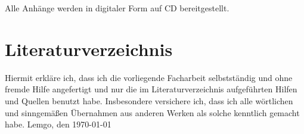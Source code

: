 \documentclass[a4paper,11pt,titlepage,ngerman]{article}
\begin{document}
\begin{sloppypar}
  Alle Anhänge werden in digitaler Form auf CD bereitgestellt.
  \section{Literaturverzeichnis}\label{sec:Literature}
  \printbibliography[heading=none]
  \newpage
  \begin{samepage}
	\thispagestyle{empty}
	Hiermit erkläre ich, dass ich die vorliegende Facharbeit selbstständig und ohne fremde Hilfe angefertigt und nur die im Literaturverzeichnis
	aufgeführten Hilfen und Quellen benutzt habe.
	Insbesondere versichere ich, dass ich alle wörtlichen
	und sinngemäßen Übernahmen aus anderen Werken als solche kenntlich gemacht habe.
	\medbreak
	Lemgo, den \today
	\medbreak
  \end{samepage}
 \end{sloppypar}
\end{document}
